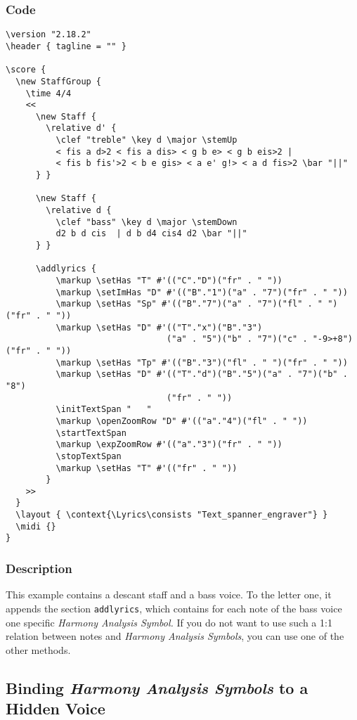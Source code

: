 \documentclass[
  DIV=calc,
  BCOR=5mm,
  12pt,
  headings=small,
  oneside,
  abstract=true,
  toc=bib,
  xcolor=dvipsnames,
  openany,
  ngerman,english]{scrartcl}
\newcommand{\has}[1]{\textit{Harmony Analysis Symbol#1}}
\begin{document}
\subsubsection{Code}

\begin{scriptsize}
\begin{verbatim}
\version "2.18.2"
\header { tagline = "" }

\score {
  \new StaffGroup {
    \time 4/4
    <<
      \new Staff {
        \relative d' {
          \clef "treble" \key d \major \stemUp
          < fis a d>2 < fis a dis> < g b e> < g b eis>2 | 
          < fis b fis'>2 < b e gis> < a e' g!> < a d fis>2 \bar "||"
      } }   

      \new Staff {
        \relative d { 
          \clef "bass" \key d \major \stemDown
          d2 b d cis  | d b d4 cis4 d2 \bar "||"
      } }   
      
      \addlyrics {
          \markup \setHas "T" #'(("C"."D")("fr" . " "))
          \markup \setImHas "D" #'(("B"."1")("a" . "7")("fr" . " "))
          \markup \setHas "Sp" #'(("B"."7")("a" . "7")("fl" . " ")("fr" . " "))
          \markup \setHas "D" #'(("T"."x")("B"."3")
                                ("a" . "5")("b" . "7")("c" . "-9>+8")("fr" . " "))
          \markup \setHas "Tp" #'(("B"."3")("fl" . " ")("fr" . " ")) 
          \markup \setHas "D" #'(("T"."d")("B"."5")("a" . "7")("b" . "8")
                                ("fr" . " "))    
          \initTextSpan "   "
          \markup \openZoomRow "D" #'(("a"."4")("fl" . " "))
          \startTextSpan
          \markup \expZoomRow #'(("a"."3")("fr" . " ")) 
          \stopTextSpan
          \markup \setHas "T" #'(("fr" . " "))
        }
    >>
  }
  \layout { \context{\Lyrics\consists "Text_spanner_engraver"} }
  \midi {}
}
\end{verbatim}
\end{scriptsize}

\subsubsection{Description}

This example contains a descant staff and a bass voice. To the letter one, it
appends the section \texttt{addlyrics}, which contains for each note of the bass
voice one specific \has. If you do not want to use such a 1:1 relation between
notes and \has{s}, you can use one of the other methods.

\subsection{Binding \has{s} to a Hidden Voice}
\label{HiddenVoice}
\end{document}
